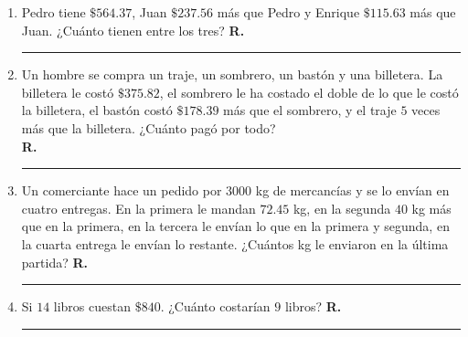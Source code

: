 \begin{enumerate}[label=\arabic*)]
\item Pedro tiene $\$564.37$, Juan $\$237.56$ más que Pedro y Enrique $\$115.63$ más que Juan. ¿Cuánto tienen entre los tres? \hspace{0.3cm} \textbf{R.} \rule{3cm}{0.1mm}
\item Un hombre se compra un traje, un sombrero, un bastón y una billetera. La billetera le costó $\$375.82$, el sombrero le ha costado el doble de lo que le costó la billetera, el bastón costó $\$178.39$ más que el sombrero, y el traje $5$ veces más que la billetera. ¿Cuánto pagó por todo? \\
\hspace{0.3cm} \textbf{R.} \rule{3cm}{0.1mm}
\item Un comerciante hace un pedido por $3000$ kg de mercancías y se lo envían en cuatro entregas. En la primera le mandan $72.45$ kg, en la segunda $40$ kg más que en la primera, en la tercera le envían lo que en la primera y segunda, en la cuarta entrega le envían lo restante. ¿Cuántos kg le enviaron en la última partida? \hspace{0.3cm} \textbf{R.} \rule{3cm}{0.1mm}
\item Si $14$ libros cuestan $\$840$. ¿Cuánto costarían $9$ libros? \hspace{0.2cm} \textbf{R.} \rule{3cm}{0.1mm}
\end{enumerate}

